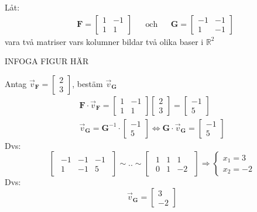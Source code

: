 \begin{Ex}
	Låt:
	\begin{align*}
	&\mathbf{F} = \begin{bmatrix} 1&-1\\1&1 \end{bmatrix}
	&&\text{och}
	&&\mathbf{G} = \begin{bmatrix} -1&-1\\1&-1 \end{bmatrix}
	\end{align*}
	vara två matriser vars kolumner bildar två olika baser i $\mathbb{R}^2$
	\begin{center}
		INFOGA FIGUR HÄR
	\end{center}
	Antag $\vec{v}_{\mathbf{F}} = \begin{bmatrix} 2\\3 \end{bmatrix}$, bestäm $\vec{v}_{\mathbf{G}}$
	\begin{gather*}
		\mathbf{F} \cdot \vec{v}_{\mathbf{F}} = \begin{bmatrix} 1 & -1\\1 & 1 \end{bmatrix} \begin{bmatrix} 2\\3 \end{bmatrix} = \begin{bmatrix} -1\\5 \end{bmatrix}\\
		\vec{v}_{\mathbf{G}} = \mathbf{G}^{-1} \cdot \begin{bmatrix} -1\\5 \end{bmatrix} \Leftrightarrow \mathbf{G} \cdot \vec{v}_{\mathbf{G}} = \begin{bmatrix} -1\\5 \end{bmatrix}
	\end{gather*}
	Dvs:
	\[
	\begin{bmatrix}
	\begin{array}{cc|c}
	    -1 & -1 & -1\\
	    1 & -1 & 5
	\end{array}
	\end{bmatrix}
	\sim .. \sim
	\begin{bmatrix}
	\begin{array}{cc|c}
	    1 & 1 & 1\\
	    0 & 1 & -2
	\end{array}
	\end{bmatrix}
	\Rightarrow
	\begin{cases}
		x_1 = 3\\
		x_2 = -2
	\end{cases}
	\]
	Dvs:
	\[
	\vec{v}_{\mathbf{G}} = \begin{bmatrix} 3\\-2 \end{bmatrix}
	\]
\end{Ex}
